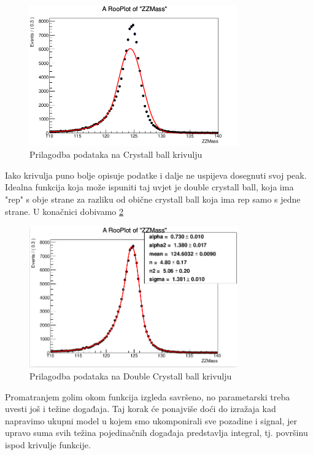 \documentclass[12pt,a4paper,oneside]{article}
\begin{document}
\begin{linenumbers}
			\begin{figure}[h!]
			\centering
			\includegraphics[width=0.8\textwidth]{cbfit.png}
			\caption[Saturn viđen u ultraljubičastom svjetlu.]{\label{sl:cbfit} Prilagodba podataka na Crystall ball krivulju}
		\end{figure}
		Iako krivulja puno bolje opisuje podatke i dalje ne uspijeva dosegnuti svoj peak.
		Idealna funkcija koja može ispuniti taj uvjet je double crystall ball, koja ima "rep" s obje strane za razliku od obične crystall ball koja ima rep samo s jedne strane.
		U konačnici dobivamo \ref{sl:dcbfit}
		\begin{figure}[h!]
			\centering
			\includegraphics[width=0.8\textwidth]{dcbfit.png}
			\caption[Saturn viđen u ultraljubičastom svjetlu.]{\label{sl:dcbfit} Prilagodba podataka na Double Crystall ball krivulju}
		\end{figure}
	
		 Promatranjem golim okom funkcija izgleda savršeno, no parametarski treba uvesti još i težine događaja. Taj korak će ponajviše doći do izražaja kad napravimo ukupni model u kojem smo ukomponirali sve pozadine i signal, jer upravo suma svih težina pojedinačnih događaja predstavlja integral, tj. površinu ispod krivulje funkcije.
		  

\end{linenumbers}
\end{document}

